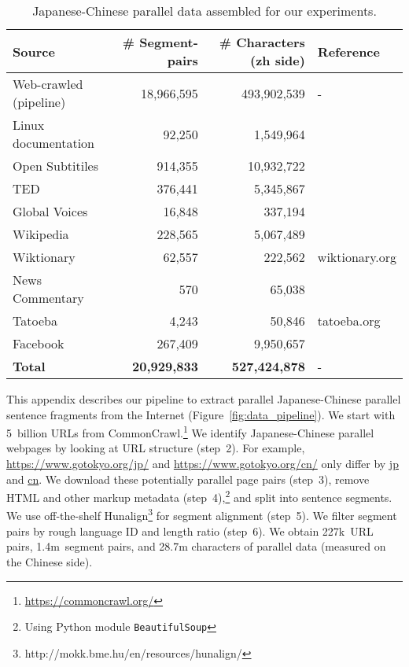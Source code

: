 \documentclass[11pt,a4paper]{article}
\begin{document}
\begin{table*}[h]
    \centering
    \begin{tabular}{lrrl}
    \textbf{Source}  & \textbf{\# Segment-pairs} & \textbf{\# Characters (zh side)} & \textbf{Reference}\\
\hline
    Web-crawled (pipeline) & 18,966,595 & 493,902,539 & - \\
    \hline 
    Linux documentation      & 92,250 & 1,549,964 & \citet{opus_2012}\\
    Open Subtitiles & 914,355 & 10,932,722 & \citet{opus_2016}\\
    TED & 376,441 & 5,345,867 & \citet{ted_corpus}\\
    Global Voices & 16,848 & 337,194 & \citet{opus_2012}\\
    Wikipedia & 228,565 & 5,067,489 & \citet{wikipedia_corpus}\\
    Wiktionary & 62,557 & 222,562 & wiktionary.org \\
    News Commentary & 570 & 65,038 & \citet{opus_2012}\\
    Tatoeba & 4,243 & 50,846  & tatoeba.org \\ 
    Facebook & 267,409 & 9,950,657 & \citet{schwenk2019wikimatrix}\\
    \hline

    \textbf{Total} & \textbf{20,929,833} & \textbf{527,424,878} & -
    \end{tabular}
    \caption{Japanese-Chinese parallel data assembled for our experiments.}
    \label{tab:data_statistics}
\end{table*}











This appendix describes our pipeline to extract parallel Japanese-Chinese parallel sentence fragments from the Internet (Figure~\ref{fig:data_pipeline}).  We start with  5~billion URLs from CommonCrawl.\footnote{\url{https://commoncrawl.org/}} We identify Japanese-Chinese parallel webpages by looking at URL structure (step~2). For example, \url{https://www.gotokyo.org/jp/} and \url{https://www.gotokyo.org/cn/} only differ by \url{jp} and \url{cn}. We download these potentially parallel page pairs (step~3), remove HTML and other markup metadata (step~4),\footnote{Using Python module \texttt{BeautifulSoup}} and split into sentence segments. We use off-the-shelf  Hunalign\footnote{http://mokk.bme.hu/en/resources/hunalign/} for segment alignment (step~5). We filter segment pairs by rough language ID and length ratio (step~6). We obtain 227k~URL pairs, 1.4m~segment pairs, and 28.7m characters of parallel data (measured on the Chinese side).
\end{document}
